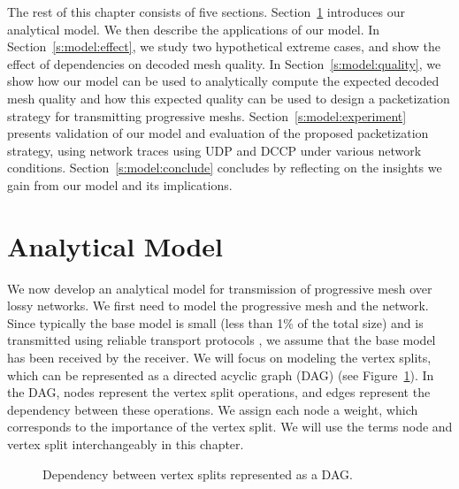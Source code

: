 
    The rest of this chapter consists of five sections. 
    Section~\ref{s:model:model} introduces our analytical model.
    We then describe the applications of our model.
    In Section~\ref{s:model:effect}, we study two hypothetical extreme
    cases, and show the effect of dependencies on
    decoded mesh quality.
    In Section~\ref{s:model:quality}, we show how our
    model can be used to analytically compute the expected
    decoded mesh quality and how this expected quality
    can be used to design a packetization strategy for transmitting
    progressive meshs.  Section~\ref{s:model:experiment} presents validation
    of our model and evaluation of the proposed packetization strategy,
    using network traces using UDP and DCCP under various
    network conditions.  
    Section~\ref{s:model:conclude} concludes by
    reflecting on the insights we gain from our model and its
    implications.

\section{Analytical Model}
\label{s:model:model}
    We now develop an analytical model for transmission of
    progressive mesh over lossy networks.  We first need to model
    the progressive mesh and the network.  Since typically
    the base model is small (less than 1\% of the total size) 
    and is transmitted using reliable
    transport protocols \cite{3tpregib}, we assume that the
    base model has been received by the
    receiver. We will focus on modeling the vertex splits,
    which can be represented as a directed acyclic graph (DAG)
    (see Figure~\ref{model:dag2}). In the DAG, nodes represent
    the vertex split operations, and edges represent the dependency
    between these operations. We assign each node a weight,
    which corresponds to the importance of the vertex split.
    We will use the terms node and vertex split interchangeably
    in this chapter.
\begin{figure}
\centering
{}
\caption{Dependency between vertex splits represented as a DAG.\label{model:dag2}}
\end{figure}


